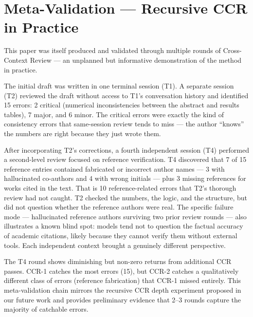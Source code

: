 \documentclass[11pt]{article}
\begin{document}
\section{Meta-Validation --- Recursive CCR in Practice}

This paper was itself produced and validated through multiple rounds of Cross-Context Review --- an unplanned but informative demonstration of the method in practice.

The initial draft was written in one terminal session (T1). A separate session (T2) reviewed the draft without access to T1's conversation history and identified 15 errors: 2 critical (numerical inconsistencies between the abstract and results tables), 7 major, and 6 minor. The critical errors were exactly the kind of consistency errors that same-session review tends to miss --- the author ``knows'' the numbers are right because they just wrote them.

After incorporating T2's corrections, a fourth independent session (T4) performed a second-level review focused on reference verification. T4 discovered that 7 of 15 reference entries contained fabricated or incorrect author names --- 3 with hallucinated co-authors and 4 with wrong initials --- plus 3 missing references for works cited in the text. That is 10 reference-related errors that T2's thorough review had not caught. T2 checked the numbers, the logic, and the structure, but did not question whether the reference authors were real. The specific failure mode --- hallucinated reference authors surviving two prior review rounds --- also illustrates a known blind spot: models tend not to question the factual accuracy of academic citations, likely because they cannot verify them without external tools. Each independent context brought a genuinely different perspective.

\begin{table}[h]
\centering
\small
{}
\caption{Meta-validation: recursive CCR on this paper.}
\end{table}

The T4 round shows diminishing but non-zero returns from additional CCR passes. CCR-1 catches the most errors (15), but CCR-2 catches a qualitatively different class of errors (reference fabrication) that CCR-1 missed entirely. This meta-validation chain mirrors the recursive CCR depth experiment proposed in our future work and provides preliminary evidence that 2--3 rounds capture the majority of catchable errors.
\end{document}
